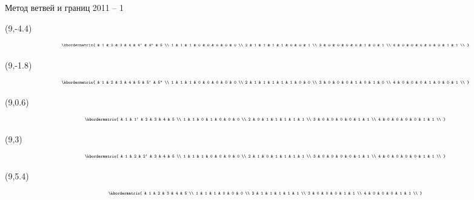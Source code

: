 \documentclass[10pt, dvipsnames]{beamer}
\begin{document}
\begin{frame}{Метод ветвей и границ 2011 -- 1}
	\begin{textblock}{1}(9,-4.4)
\[
\tiny
  \kbordermatrix{
      & 1 & 2 & 3 & 4 & 4` & 4`` & 5 \\
    1 & 1 & 1 & 0 & 0 & 0  & 0   & 0 \\
    2 & 1 & 1 & 1 & 1 & 0  & 0   & 1 \\
    3 & 0 & 0 & 0 & 0 & 1  & 0   & 1 \\
    4 & 0 & 0 & 0 & 0 & 0  & 1   & 1 \\
  }
\]
	\end{textblock}

	\begin{textblock}{1}(9,-1.8)
\[
\tiny
  \kbordermatrix{
      & 1 & 2 & 3 & 4 & 5 & 5` & 5`` \\
    1 & 1 & 1 & 0 & 0 & 0 & 0  & 0   \\
    2 & 1 & 1 & 1 & 1 & 1 & 0  & 0   \\
    3 & 0 & 0 & 0 & 1 & 0 & 1  & 0   \\
    4 & 0 & 0 & 0 & 1 & 0 & 0  & 1   \\
  }
\]
	\end{textblock}

	\begin{textblock}{1}(9,0.6)
\[
\tiny
  \kbordermatrix{
      & 1 & 1` & 2 & 3 & 4 & 5 \\
    1 & 1 & 0  & 1 & 0 & 0 & 0 \\
    2 & 0 & 1  & 1 & 1 & 1 & 1 \\
    3 & 0 & 0  & 0 & 0 & 1 & 1 \\
    4 & 0 & 0  & 0 & 0 & 1 & 1 \\
  }
\]
	\end{textblock}

	\begin{textblock}{1}(9,3)
	\[
\tiny
  \kbordermatrix{
      & 1 & 2 & 2` & 3 & 4 & 5 \\
    1 & 1 & 1 & 0  & 0 & 0 & 0 \\
    2 & 1 & 0 & 1  & 1 & 1 & 1 \\
    3 & 0 & 0 & 0  & 0 & 1 & 1 \\
    4 & 0 & 0 & 0  & 0 & 1 & 1 \\
  }
\]
	\end{textblock}

	\begin{textblock}{1}(9,5.4)
	\[
\tiny
  \kbordermatrix{
      & 1 & 2 & 3 & 4 & 5 \\
    1 & 1 & 1 & 0 & 0 & 0 \\
    2 & 1 & 1 & 1 & 1 & 1 \\
    3 & 0 & 0 & 0 & 1 & 1 \\
    4 & 0 & 0 & 0 & 1 & 1 \\
  }
\]
	\end{textblock}
	

\end{frame}
\end{document}
